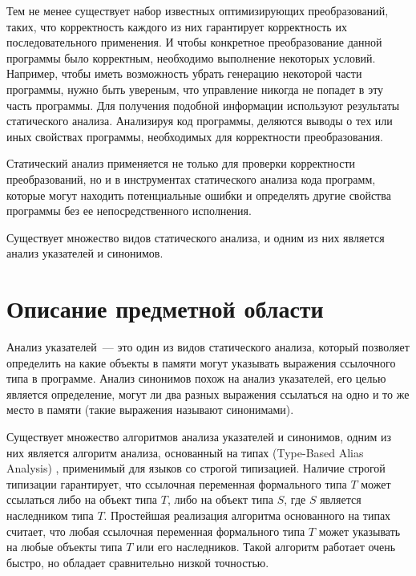 \documentclass[a4,14pt,titlepage]{extarticle}
\newcommand{\eng}[1]{{\English#1}}
\begin{document}
    Тем не менее существует набор известных оптимизирующих преобразований,
    таких, что корректность каждого из них гарантирует корректность их
    последовательного применения.
    И чтобы конкретное преобразование данной программы было корректным,
    необходимо выполнение некоторых условий. Например, чтобы иметь
    возможность убрать генерацию некоторой части программы, нужно быть
    увереным, что управление никогда не попадет в эту часть программы.
    Для получения подобной информации используют результаты статического
    анализа. Анализируя код программы, деляются выводы о тех или иных свойствах
    программы, необходимых для корректности преобразования.

    Статический анализ применяется не только для проверки
    корректности преобразований, но и в инструментах статического анализа
    кода программ, которые могут находить потенциальные ошибки и определять
    другие свойства программы без ее непосредственного исполнения.

    Существует множество видов статического анализа, и одним из них
    является анализ указателей и синонимов.

  \newpage
  \section{Описание предметной области}

    Анализ указателей~--- это один из видов статического анализа, который
    позволяет определить на какие объекты в памяти могут указывать выражения
    ссылочного типа в программе. Анализ синонимов похож на анализ указателей,
    его целью является определение, могут ли два разных выражения ссылаться
    на одно и то же место в памяти (такие выражения называют синонимами).

    Существует множество алгоритмов анализа указателей и синонимов,
    одним из них является алгоритм анализа, основанный на типах
    (\eng{Type-Based Alias Analysis}) \cite{diwan_tbaa},
    применимый для языков со строгой типизацией.
    Наличие строгой типизации гарантирует, что ссылочная переменная формального
    типа $T$ может ссылаться либо на объект типа $T$, либо на объект типа $S$,
    где $S$ является наследником типа $T$.
    Простейшая реализация алгоритма основанного на типах считает, что
    любая ссылочная переменная формального типа $T$ может указывать на любые
    объекты типа $T$ или его наследников. Такой алгоритм работает очень быстро,
    но обладает сравнительно низкой точностью.
\end{document}

